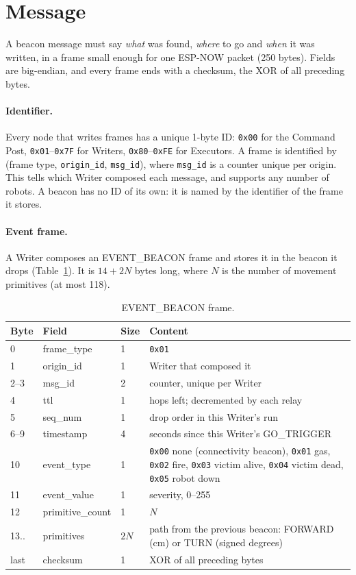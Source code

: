 \section{Message}\label{sec:message}

A beacon message must say \emph{what} was found, \emph{where} to go and
\emph{when} it was written, in a frame small enough for one ESP-NOW packet
(250 bytes). Fields are big-endian, and every frame ends with a checksum, the
XOR of all preceding bytes.

\paragraph{Identifier.} Every node that writes frames has a unique 1-byte
ID: \texttt{0x00} for the Command Post, \texttt{0x01}--\texttt{0x7F} for
Writers, \texttt{0x80}--\texttt{0xFE} for Executors. A frame is identified by
(frame type, \texttt{origin\_id}, \texttt{msg\_id}), where \texttt{msg\_id} is
a counter unique per origin. This tells which Writer composed each message,
and supports any number of robots. A beacon has no ID of its own: it is named
by the identifier of the frame it stores.

\paragraph{Event frame.} A Writer composes an EVENT\_BEACON frame and stores
it in the beacon it drops (Table~\ref{tab:event-frame}). It is $14 + 2N$
bytes long, where $N$ is the number of movement primitives (at most 118).

\begin{table}[h]
\centering
\small
\begin{tabularx}{\textwidth}{@{}l l l X@{}}
\toprule
Byte & Field & Size & Content \\
\midrule
0 & frame\_type & 1 & \texttt{0x01} \\
1 & origin\_id & 1 & Writer that composed it \\
2--3 & msg\_id & 2 & counter, unique per Writer \\
4 & ttl & 1 & hops left; decremented by each relay \\
5 & seq\_num & 1 & drop order in this Writer's run \\
6--9 & timestamp & 4 & seconds since this Writer's GO\_TRIGGER \\
10 & event\_type & 1 & \texttt{0x00} none (connectivity beacon), \texttt{0x01}
  gas, \texttt{0x02} fire, \texttt{0x03} victim alive, \texttt{0x04} victim
  dead, \texttt{0x05} robot down \\
11 & event\_value & 1 & severity, 0--255 \\
12 & primitive\_count & 1 & $N$ \\
13.. & primitives & $2N$ & path from the previous beacon: FORWARD (cm) or
  TURN (signed degrees) \\
last & checksum & 1 & XOR of all preceding bytes \\
\bottomrule
\end{tabularx}
\caption{EVENT\_BEACON frame.}
\label{tab:event-frame}
\end{table}

